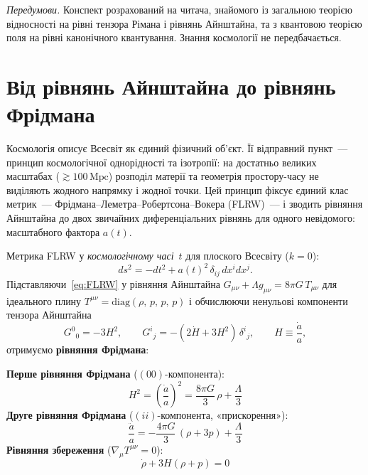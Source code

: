 \documentclass[12pt, a4paper]{article}
\begin{document}
\bigskip
\noindent
\textit{Передумови.} Конспект розрахований на читача, знайомого із
загальною теорією відносності на рівні тензора Рімана і рівнянь
Айнштайна, та з квантовою теорією поля на рівні канонічного
квантування. Знання космології не передбачається.

\newpage

\section{Від рівнянь Айнштайна до рівнянь Фрідмана}
\label{sec:friedmann}

Космологія описує Всесвіт як єдиний фізичний об'єкт. Її відправний
пункт~--- принцип космологічної однорідності та ізотропії: на
достатньо великих масштабах ($\gtrsim 100\,\mathrm{Mpc}$) розподіл
матерії та геометрія простору-часу не виділяють жодного напрямку і
жодної точки. Цей принцип фіксує єдиний клас метрик~---
Фрідмана--Леметра--Робертсона--Вокера (FLRW)~--- і зводить
рівняння Айнштайна до двох звичайних диференціальних рівнянь для
одного невідомого: масштабного фактора $a(t)$.

Метрика FLRW у \emph{космологічному часі}~$t$ для плоского Всесвіту
($k = 0$):
\begin{equation}\label{eq:FLRW}
  ds^2 = -dt^2 + a(t)^2\,\delta_{ij}\,dx^i dx^j.
\end{equation}
Підставляючи~\eqref{eq:FLRW} у рівняння Айнштайна
$G_{\mu\nu} + \Lambda g_{\mu\nu} = 8\pi G\,T_{\mu\nu}$
для ідеального плину
$T^{\mu\nu} = \mathrm{diag}(\rho,\,p,\,p,\,p)$
і обчислюючи ненульові компоненти тензора Айнштайна
\begin{equation*}
  G^0{}_0 = -3H^2,
  \qquad
  G^i{}_j = -(2\dot H + 3H^2)\,\delta^i{}_j,
  \qquad
  H \equiv \frac{\dot a}{a},
\end{equation*}
отримуємо \textbf{рівняння Фрідмана}:

\begin{keybox}
\textbf{Перше рівняння Фрідмана} ($(00)$-компонента):
\begin{equation}\label{eq:F1}
  H^2 = \left(\frac{\dot a}{a}\right)^2
      = \frac{8\pi G}{3}\,\rho + \frac{\Lambda}{3}
\end{equation}
\textbf{Друге рівняння Фрідмана} ($(ii)$-компонента, «прискорення»):
\begin{equation}\label{eq:F2}
  \frac{\ddot a}{a} = -\frac{4\pi G}{3}\,(\rho + 3p) + \frac{\Lambda}{3}
\end{equation}
\textbf{Рівняння збереження} ($\nabla_\mu T^{\mu\nu} = 0$):
\begin{equation}\label{eq:conservation_low}
  \dot\rho + 3H(\rho + p) = 0
\end{equation}
\end{keybox}
\end{document}
